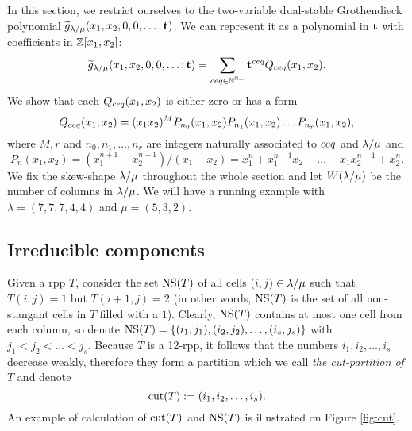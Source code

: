 \documentclass[numbers=enddot,12pt,final,onecolumn,notitlepage]{scrartcl}%
\theoremstyle{definition}
\let\sumnonlimits\sum
\renewcommand{\sum}{\sumnonlimits\limits}
\begin{document}
In this section, we restrict ourselves to the two-variable dual-stable Grothendieck polynomial ${\widetilde{g}}_{\lambda/\mu}(x_1,x_2,0,0,\dots;{\mathbf{t}})$. We can represent it as a polynomial in ${\mathbf{t}}$ with coefficients in $\mathbb{Z}[x_1,x_2]$:
$$\g_\lm(x_1,x_2,0,0,\dots;\t)=\sum_{\ceqvar\in \N^{\N_+}}\t^\ceqvar Q_\ceqvar(x_1,x_2).$$
We show that each $Q_{{ceq}}(x_1,x_2)$ is either zero or has a form
$$Q_{{ceq}}(x_1,x_2)=(x_1x_2)^{M} P_{n_0}(x_1,x_2)P_{n_1}(x_1,x_2)\dots P_{n_r}(x_1,x_2) ,$$
where $M,r$ and $n_0,n_1,\dots,n_{r}$ are integers naturally associated to ${{ceq}}$ and ${\lambda/\mu}$ and 
$$P_n(x_1,x_2)=(x_1^{n+1}-x_2^{n+1})/(x_1-x_2)=x_1^{n}+x_1^{n-1}x_2+\dots+x_1x_2^{n-1}+x_2^n.$$
We fix the skew-shape ${\lambda/\mu}$ throughout the whole section and let $W({\lambda/\mu})$ be the number of columns in ${\lambda/\mu}$. We will have a running example with $\lambda=(7,7,7,4,4)$ and $\mu=(5,3,2)$.



\subsection{Irreducible components}
Given a rpp $T$, consider the set ${\operatorname*{NS}}(T)$ of all cells $(i,j)\in {\lambda/\mu}$ such that $T(i,j)=1$ but $T(i+1,j)=2$ (in other words, ${\operatorname*{NS}}(T)$ is the set of all non-stangant cells in $T$ filled with a $1$). Clearly, ${\operatorname*{NS}}(T)$ contains at most one cell from each column, so denote ${\operatorname*{NS}}(T)=\{(i_1,j_1),(i_2,j_2),\dots,(i_s,j_s)\}$ with $j_1<j_2<\dots<j_s$. Because $T$ is a 12-rpp, it follows that the numbers $i_1,i_2,\dots,i_s$ decrease weakly, therefore they form a partition which we call \textit{the cut-partition of} $T$ and denote 
$${\operatorname*{cut}}(T):=(i_1,i_2,\dots,i_s).$$ 
An example of calculation of ${\operatorname*{cut}}(T)$ and ${\operatorname*{NS}}(T)$ is illustrated on Figure \ref{fig:cut}.

\def\one{{\mathbf{1}}}
\def\two{{\mathbf{1}}}
\end{document}
